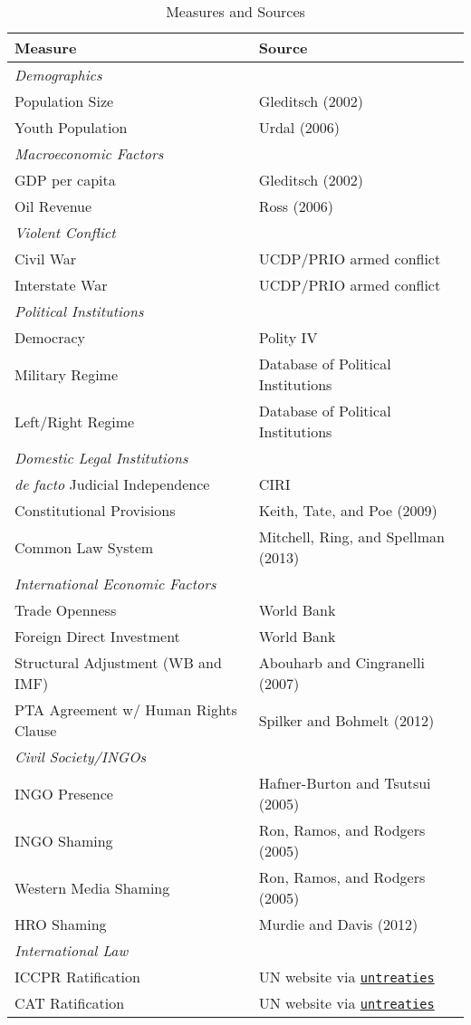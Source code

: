 \documentclass[11pt]{article}
\begin{document}
\begin{table}[htbp!] 
\caption{Measures and Sources} 
\label{tab:vars}
\centering
\begin{tabular}{ll}
Measure & Source \\
\toprule
{\em Demographics} & \\
Population Size & Gleditsch (2002) \\
Youth Population & Urdal (2006) \\ 
\midrule
{\em Macroeconomic Factors} & \\
GDP per capita & Gleditsch (2002) \\
Oil Revenue & Ross (2006) \\ 
\midrule
{\em Violent Conflict} & \\
Civil War & UCDP/PRIO armed conflict \\
Interstate War & UCDP/PRIO armed conflict \\
\midrule
{\em Political Institutions} & \\
Democracy & Polity IV \\
Military Regime & Database of Political Institutions \\
Left/Right Regime & Database of Political Institutions  \\
\midrule
{\em Domestic Legal Institutions} & \\
{\em de facto} Judicial Independence & CIRI \\
Constitutional Provisions & Keith, Tate, and Poe (2009) \\
Common Law System & Mitchell, Ring, and Spellman (2013) \\
\midrule
{\em International Economic Factors} & \\
Trade Openness & World Bank \\
Foreign Direct Investment & World Bank \\
Structural Adjustment (WB and IMF) & Abouharb and Cingranelli (2007) \\
PTA Agreement w/ Human Rights Clause & Spilker and Bohmelt (2012) \\
\midrule
{\em Civil Society/INGOs} & \\
INGO Presence & Hafner-Burton and Tsutsui (2005) \\
INGO Shaming & Ron, Ramos, and Rodgers (2005)  \\
Western Media Shaming & Ron, Ramos, and Rodgers (2005) \\
HRO Shaming & Murdie and Davis (2012) \\
\midrule
{\em International Law} & \\
ICCPR Ratification & UN website via {\tt \href{http://github.com/zmjones/untreaties}{untreaties}} \\
CAT Ratification & UN website via {\tt \href{http://github.com/zmjones/untreaties}{untreaties}} \\
\bottomrule
\end{tabular}
\end{table}
\end{document}
